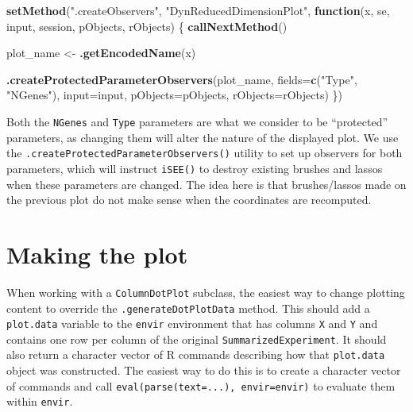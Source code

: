 \documentclass[
]{book}
\newenvironment{Shaded}{\begin{snugshade}}{\end{snugshade}}
\newcommand{\ControlFlowTok}[1]{\textcolor[rgb]{0.13,0.29,0.53}{\textbf{#1}}}
\newcommand{\DataTypeTok}[1]{\textcolor[rgb]{0.13,0.29,0.53}{#1}}
\newcommand{\KeywordTok}[1]{\textcolor[rgb]{0.13,0.29,0.53}{\textbf{#1}}}
\newcommand{\NormalTok}[1]{#1}
\newcommand{\StringTok}[1]{\textcolor[rgb]{0.31,0.60,0.02}{#1}}
\begin{document}
\begin{Shaded}
\begin{Highlighting}[]
\KeywordTok{setMethod}\NormalTok{(}\StringTok{".createObservers"}\NormalTok{, }\StringTok{"DynReducedDimensionPlot"}\NormalTok{, }
    \ControlFlowTok{function}\NormalTok{(x, se, input, session, pObjects, rObjects) }
\NormalTok{\{}
    \KeywordTok{callNextMethod}\NormalTok{()}

\NormalTok{    plot_name <-}\StringTok{ }\KeywordTok{.getEncodedName}\NormalTok{(x)}

    \KeywordTok{.createProtectedParameterObservers}\NormalTok{(plot_name,}
        \DataTypeTok{fields=}\KeywordTok{c}\NormalTok{(}\StringTok{"Type"}\NormalTok{, }\StringTok{"NGenes"}\NormalTok{),}
        \DataTypeTok{input=}\NormalTok{input, }\DataTypeTok{pObjects=}\NormalTok{pObjects, }\DataTypeTok{rObjects=}\NormalTok{rObjects)}
\NormalTok{\})}
\end{Highlighting}
\end{Shaded}

Both the \texttt{NGenes} and \texttt{Type} parameters are what we consider to be ``protected'' parameters,
as changing them will alter the nature of the displayed plot.
We use the \texttt{.createProtectedParameterObservers()} utility to set up observers for both parameters,
which will instruct \texttt{iSEE()} to destroy existing brushes and lassos when these parameters are changed.
The idea here is that brushes/lassos made on the previous plot do not make sense when the coordinates are recomputed.

\hypertarget{making-the-plot}{%
\section{Making the plot}\label{making-the-plot}}

When working with a \texttt{ColumnDotPlot} subclass, the easiest way to change plotting content to override the \texttt{.generateDotPlotData} method.
This should add a \texttt{plot.data} variable to the \texttt{envir} environment that has columns \texttt{X} and \texttt{Y} and contains one row per column of the original \texttt{SummarizedExperiment}.
It should also return a character vector of R commands describing how that \texttt{plot.data} object was constructed.
The easiest way to do this is to create a character vector of commands and call \texttt{eval(parse(text=...),\ envir=envir)} to evaluate them within \texttt{envir}.
\end{document}

